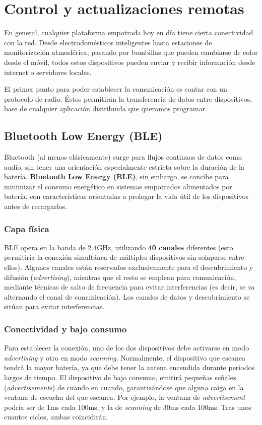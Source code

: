 \documentclass[../main.tex]{subfiles}
\begin{document}
\section{Control y actualizaciones remotas}

        En general, cualquier plataforma empotrada hoy en día tiene cierta conectividad con la red. Desde electrodomésticos inteligentes hasta estaciones de monitorización atmosférica, pasando por bombillas que pueden cambiarse de color desde el móvil, todos estos dispositivos pueden enviar y recibir información desde internet o servidores locales.

        El primer punto para poder establecer la comunicación es contar con un protocolo de radio. Éstos permitirán la transferencia de datos entre dispositivos, base de cualquier aplicación distribuida que queramos programar.

        \subsection{Bluetooth Low Energy (BLE)}

            Bluetooth (al menos clásicamente) surge para flujos continuos de datos como audio, sin tener una orientación especialmente estricta sobre la duración de la batería. \textbf{Bluetooth Low Energy (BLE)}, sin embargo, se concibe para minimizar el consumo energético en sistemas empotrados alimentados por batería, con características orientadas a prologar la vida útil de los dispositivos antes de recargarlos.

            \subsubsection{Capa física}
                BLE opera en la banda de 2.4GHz, utilizando \textbf{40 canales} diferentes (esto permitiría la conexión simultánea de múltiples dispositivos sin solaparse entre ellos). Algunos canales están reservados exclusivamente para el descubrimiento y difusión (\emph{advertising}), mientras que el resto se emplean para comunicación, mediante técnicas de salto de frecuencia para evitar interferencias (es decir, se va alternando el canal de comunicación). Los canales de datos y descubrimiento se sitúan para evitar interferencias.

            \subsubsection{Conectividad y bajo consumo}
                Para establecer la conexión, uno de los dos dispositivos debe activarse en modo \emph{advertising} y otro en modo \emph{scanning}. Normalmente, el dispositivo que escanea tendrá la mayor batería, ya que debe tener la antena encendida durante periodos largos de tiempo. El dispositivo de bajo consumo, emitirá pequeñas señales (\emph{advertisements}) de cuando en cuando, garantizándose que alguna caiga en la ventana de escucha del que escanea. Por ejemplo, la ventana de \emph{advertisement} podría ser de 1ms cada 100ms, y la de \emph{scanning} de 30ms cada 100ms. Tras unos cuantos ciclos, ambas coincidirán.
\end{document}

